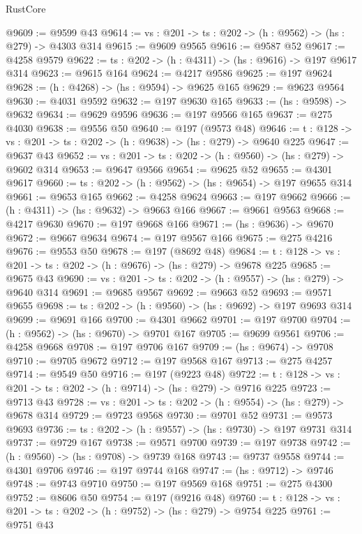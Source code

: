 \begin{lexlean}{RustCore}
\begin{coremodule}
@9609 := @9599 @43
@9614 := {vs : @201} -> {ts : @202} -> (h : @9562) -> (hs : @279) -> @4303 @314
@9615 := @9609 @9565
@9616 := @9587 @52
@9617 := @4258 @9579
@9622 := {ts : @202} -> (h : @4311) -> (hs : @9616) -> @197 @9617 @314
@9623 := @9615 @164
@9624 := @4217 @9586
@9625 := @197 @9624
@9628 := (h : @4268) -> (hs : @9594) -> @9625 @165
@9629 := @9623 @9564
@9630 := @4031 @9592
@9632 := @197 @9630 @165
@9633 := (hs : @9598) -> @9632
@9634 := @9629 @9596
@9636 := @197 @9566 @165
@9637 := @275 @4030
@9638 := @9556 @50
@9640 := @197 (@9573 @48)
@9646 := {t : @128} -> {vs : @201} -> {ts : @202} -> (h : @9638) -> (hs : @279) -> @9640 @225
@9647 := @9637 @43
@9652 := {vs : @201} -> {ts : @202} -> (h : @9560) -> (hs : @279) -> @9602 @314
@9653 := @9647 @9566
@9654 := @9625 @52
@9655 := @4301 @9617
@9660 := {ts : @202} -> (h : @9562) -> (hs : @9654) -> @197 @9655 @314
@9661 := @9653 @165
@9662 := @4258 @9624
@9663 := @197 @9662
@9666 := (h : @4311) -> (hs : @9632) -> @9663 @166
@9667 := @9661 @9563
@9668 := @4217 @9630
@9670 := @197 @9668 @166
@9671 := (hs : @9636) -> @9670
@9672 := @9667 @9634
@9674 := @197 @9567 @166
@9675 := @275 @4216
@9676 := @9553 @50
@9678 := @197 (@8692 @48)
@9684 := {t : @128} -> {vs : @201} -> {ts : @202} -> (h : @9676) -> (hs : @279) -> @9678 @225
@9685 := @9675 @43
@9690 := {vs : @201} -> {ts : @202} -> (h : @9557) -> (hs : @279) -> @9640 @314
@9691 := @9685 @9567
@9692 := @9663 @52
@9693 := @9571 @9655
@9698 := {ts : @202} -> (h : @9560) -> (hs : @9692) -> @197 @9693 @314
@9699 := @9691 @166
@9700 := @4301 @9662
@9701 := @197 @9700
@9704 := (h : @9562) -> (hs : @9670) -> @9701 @167
@9705 := @9699 @9561
@9706 := @4258 @9668
@9708 := @197 @9706 @167
@9709 := (hs : @9674) -> @9708
@9710 := @9705 @9672
@9712 := @197 @9568 @167
@9713 := @275 @4257
@9714 := @9549 @50
@9716 := @197 (@9223 @48)
@9722 := {t : @128} -> {vs : @201} -> {ts : @202} -> (h : @9714) -> (hs : @279) -> @9716 @225
@9723 := @9713 @43
@9728 := {vs : @201} -> {ts : @202} -> (h : @9554) -> (hs : @279) -> @9678 @314
@9729 := @9723 @9568
@9730 := @9701 @52
@9731 := @9573 @9693
@9736 := {ts : @202} -> (h : @9557) -> (hs : @9730) -> @197 @9731 @314
@9737 := @9729 @167
@9738 := @9571 @9700
@9739 := @197 @9738
@9742 := (h : @9560) -> (hs : @9708) -> @9739 @168
@9743 := @9737 @9558
@9744 := @4301 @9706
@9746 := @197 @9744 @168
@9747 := (hs : @9712) -> @9746
@9748 := @9743 @9710
@9750 := @197 @9569 @168
@9751 := @275 @4300
@9752 := @8606 @50
@9754 := @197 (@9216 @48)
@9760 := {t : @128} -> {vs : @201} -> {ts : @202} -> (h : @9752) -> (hs : @279) -> @9754 @225
@9761 := @9751 @43

\end{coremodule}
\end{lexlean}
